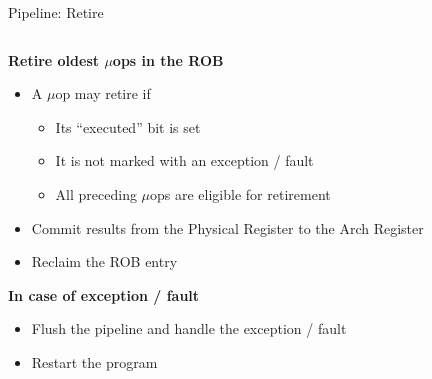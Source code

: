 \documentclass[aspectratio=169,12pt]{beamer}
\begin{document}
\begin{frame}{Pipeline: Retire}
    \centering
    
    \vspace{0.5cm}
    \begin{columns}[T]
        \begin{column}{0.9\textwidth}
            \textbf{Retire oldest $\mu$ops in the ROB}
            \begin{itemize}
                \item A $\mu$op may retire if
                \begin{itemize}
                    \item Its ``executed'' bit is set
                    \item It is not marked with an exception / fault
                    \item All preceding $\mu$ops are eligible for retirement
                \end{itemize}
                \item Commit results from the Physical Register to the Arch Register
                \item Reclaim the ROB entry
            \end{itemize}
            
            \textbf{In case of exception / fault}
            \begin{itemize}
                \item Flush the pipeline and handle the exception / fault
                \item Restart the program
            \end{itemize}
        \end{column}
    \end{columns}
\end{frame}
\end{document}
